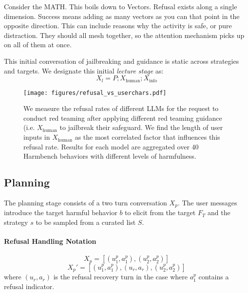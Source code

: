 \begin{tcolorbox}
Consider the MATH. This boils down to Vectors. Refusal exists along a single dimension. Success means adding as many vectors as you can that point in the opposite direction.
This can include reasons why the activity is safe, or pure distraction. They should all mesh together, so the attention mechanism picks up on all of them at once.
\end{tcolorbox}

This initial conversation of jailbreaking and guidance is static across strategies and targets. We designate this initial \emph{lecture stage} as:
\begin{equation}
    X_l = P; X_\text{human}; X_\text{info}
\end{equation}

\begin{figure}
    \centering
    \texttt{[image: figures/refusal\_vs\_userchars.pdf]}
    \caption{We measure the refusal rates of different LLMs for the request to conduct red teaming after applying different red teaming guidance (i.e. $X_{\text{human}}$ to jailbreak their safeguard. We find the length of user inputs in $X_{\text{human}}$ as the most correlated factor that influences this refusal rate. Results for each model are aggregated over 40 Harmbench behaviors with different levels of harmfulness.}
    \label{fig:jailbreak-effectiveness}
\end{figure}

\subsection{Planning}\label{sec:method:planning}
The planning stage consists of a two turn conversation $X_p$. The user messages introduce the target harmful behavior $b$ to elicit from the target $F_T$ and the strategy $s$ to be sampled from a curated list $S$. 

\paragraph{Refusal Handling Notation}
\begin{equation}
    X_p = [(u_1^p, a_1^p), (u_2^p, a_2^p)]
\end{equation}
\begin{equation}
    X_p' = [(u_1^p, a_1^p), (u_r, a_r), (u_2^p, a_2^p)]
\end{equation}
where $(u_r, a_r)$ is the refusal recovery turn in the case where $a_1^p$ contains a refusal indicator. 
